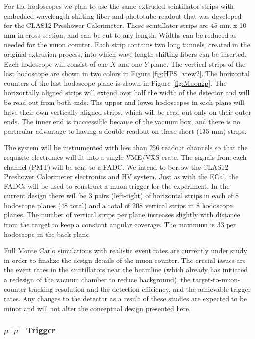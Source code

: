 For the hodoscopes we plan to use the same extruded scintillator strips with embedded wavelength-shifting fiber and phototube readout that was 
developed for the CLAS12 Preshower Calorimeter. These scintillator strips are 45 mm x 10 mm in cross section, and can be cut to any length. 
Widths can be reduced as needed for the muon counter. Each strip contains two long tunnels, created in the original extrusion process, into 
which wave-length shifting fibers can be inserted.  Each hodoscope will consist of one $X$ and one $Y$ plane.  The vertical strips of the last 
hodoscope are shown in two colors in Figure \ref{fig:HPS_view2}. The horizontal counters of the last 
hodoscope plane is shown in
Figure \ref{fig:Muon2p}. The horizontally aligned strips will extend over half the width of the detector and will be read out from both ends.  
The upper and lower hodoscopes in each plane will have their own vertically aligned strips, which will be read out only on their outer ends.  
The inner end is inaccessible because of the vacuum box, and there is no particular advantage to having a double readout on these short 
(135 mm) strips.  

The system will be instrumented with less than 256 readout channels so that the requisite electronics will 
fit into a single VME/VXS crate.  The signals from each channel (PMT) 
will be sent to a FADC.  We intend to borrow the CLAS12 Preshower Calorimeter electronics and HV system.  Just as with the ECal, the FADCs will be 
used to construct a muon trigger for the experiment.  In the current design there will be 3 pairs (left-right) of horizontal strips in 
each of 8 hodoscope planes (48 total) and a total of 208 vertical strips in 8 hodoscope planes.  The number of vertical strips per plane 
increases slightly with distance from the target to keep a constant angular coverage.  The maximum is 33 per hodoscope in the back plane.

Full Monte Carlo simulations with realistic event rates are currently under study in order to finalize the design details of the muon counter.  
The crucial issues are the event rates in the scintillators near the beamline (which already has initiated a redesign of the vacuum chamber 
to reduce background), the target-to-muon-counter tracking resolution and the detection efficiency, and the achievable trigger rates.  
Any changes to the detector as a result of these studies are expected to be minor and will not alter the conceptual design presented here.

\subsubsection{ $\mu^+\mu^-$ Trigger} 

